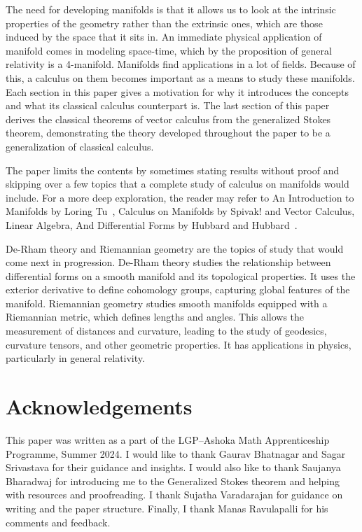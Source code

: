 \documentclass{article}
\theoremstyle{definition}
\theoremstyle{named}
\begin{document}
The need for developing manifolds is that it allows us to look at the intrinsic properties of the geometry rather than the extrinsic ones, which are those induced by the space that it sits in. An immediate physical application of manifold comes in modeling space-time, which by the proposition of general relativity is a 4-manifold. Manifolds find applications in a lot of fields. Because of this, a calculus on them becomes important as a means to study these manifolds. Each section in this paper gives a motivation for why it introduces the concepts and what its classical calculus counterpart is. The last section of this paper derives the classical theorems of vector calculus from the generalized Stokes theorem, demonstrating the theory developed throughout the paper to be a generalization of classical calculus. 

The paper limits the contents by sometimes stating results without proof and skipping over a few topics that a complete study of calculus on manifolds would include. For a more deep exploration, the reader may refer to An Introduction to Manifolds by Loring Tu~\cite{tu2010introduction}, Calculus on Manifolds by Spivak!\cite{spivak1971calculus} and Vector Calculus, Linear Algebra, And Differential Forms by Hubbard and Hubbard~\cite{hubbard2009vector}.

De-Rham theory and Riemannian geometry are the topics of study that would come next in progression. De-Rham theory studies the relationship between differential forms on a smooth manifold and its topological properties. It uses the exterior derivative to define cohomology groups, capturing global features of the manifold. Riemannian geometry studies smooth manifolds equipped with a Riemannian metric, which defines lengths and angles. This allows the measurement of distances and curvature, leading to the study of geodesics, curvature tensors, and other geometric properties. It has applications in physics, particularly in general relativity.

\section{Acknowledgements}
This paper was written as a part of the LGP--Ashoka Math Apprenticeship Programme, Summer 2024. I would like to thank Gaurav Bhatnagar and Sagar Srivastava for their guidance and insights. I would also like to thank Saujanya Bharadwaj for introducing me to the Generalized Stokes theorem and helping with resources and proofreading. I thank Sujatha Varadarajan for guidance on writing and the paper structure. Finally, I thank Manas Ravulapalli for his comments and feedback.


\end{document}
